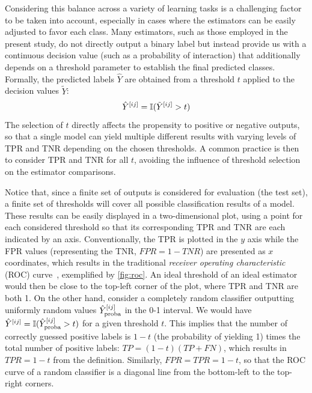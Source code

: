 Considering this balance across a variety of learning tasks
is a challenging factor to be taken into account, especially in cases where the estimators can be easily adjusted to favor each class.
%
Many estimators, such as those employed in the present study, do not directly output a binary label but instead provide us with a continuous decision value (such as a probability of interaction) that additionally depends on a threshold parameter to establish the final predicted classes. Formally, the predicted labels $\hat Y$ are obtained from a threshold $t$ applied to the decision values $\tilde Y$:
%
\begin{equation}
    \hat Y^{[ij]} = \mathbb{I}(\tilde Y^{[ij]} > t)
\end{equation}
%
The selection of $t$ directly affects the propensity to positive or negative outputs, so that a single model can yield multiple different results with varying levels of TPR and TNR depending on the chosen thresholds.
A common practice is then to consider TPR and TNR for all $t$, avoiding the influence of threshold selection on the estimator comparisons.

Notice that, since a finite set of outputs is considered for evaluation (the test set), a finite set of thresholds will cover all possible classification results of a model. These results can be easily displayed in a two-dimensional plot, using a point for each considered threshold so that its corresponding TPR and TNR are each indicated by an axis. Conventionally, the TPR is plotted in the $y$ axis while the FPR values (representing the TNR, $FPR=1-TNR$) are presented as $x$ coordinates, which results in the traditional \emph{receiver operating characteristic} (ROC) curve~\cite{davis2006relationship,hand2009measuring,he2009learning,ezzat2019computational}, exemplified by \autoref{fig:roc}.
%
An ideal threshold of an ideal estimator would then be close to the top-left corner of the plot, where TPR and TNR are both 1.
On the other hand, consider a completely random classifier outputting uniformly random values $\hat Y_\text{proba}^{[ij]}$ in the 0-1 interval. We would have $\hat Y^{[ij]} = \mathbb{I}(\hat Y_\text{proba}^{[ij]} > t)$ for a given threshold $t$. This implies that the number of correctly guessed positive labels is $1-t$ (the probability of yielding 1) times the total number of positive labels: $TP = (1-t) (TP+FN)$, which results in $TPR = 1-t$ from the definition. Similarly, $FPR = TPR = 1-t$, so that the ROC curve of a random classifier is a diagonal line from the bottom-left to the top-right corners.


